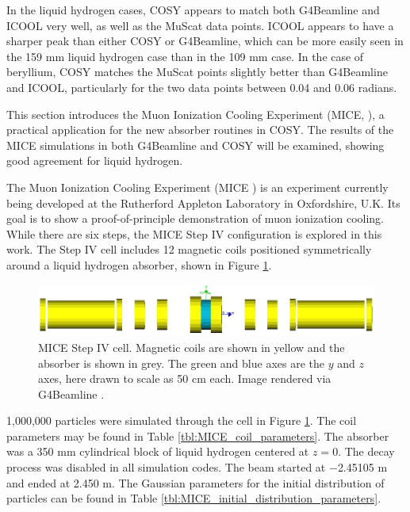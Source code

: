 In the liquid hydrogen cases, COSY appears to match both G4Beamline and ICOOL very well, as well as the MuScat data points. ICOOL appears to have a sharper peak than either COSY or G4Beamline, which can be more easily seen in the 159 mm liquid hydrogen case than in the 109 mm case. In the case of beryllium, COSY matches the MuScat points slightly better than G4Beamline and ICOOL, particularly for the two data points between 0.04 and 0.06 radians.

\label{sec:mice}

This section introduces the Muon Ionization Cooling Experiment (MICE, \cite{mice}), a practical application for the new absorber routines in COSY. The results of the MICE simulations in both G4Beamline and COSY will be examined, showing good agreement for liquid hydrogen.

\label{ssc:miceIntro}
The Muon Ionization Cooling Experiment (MICE \cite{mice}) is an experiment currently being developed at the Rutherford Appleton Laboratory in Oxfordshire, U.K. Its goal is to show a proof-of-principle demonstration of muon ionization cooling. While there are six steps, the MICE Step IV configuration is explored in this work. The Step IV cell includes 12 magnetic coils positioned symmetrically around a liquid hydrogen absorber, shown in Figure \ref{fig:miceStepIV}.
\begin{figure}[h!]
  \centering
    \includegraphics[width=\textwidth]{Figures/miceStepIV} 
  \caption[MICE Step IV cell.]{MICE Step IV cell. Magnetic coils are shown in yellow and the absorber is shown in grey. The green and blue axes are the $y$ and $z$ axes, here drawn to scale as 50 cm each. Image rendered via G4Beamline \cite{g4bl}.}
  \label{fig:miceStepIV}
\end{figure}

\label{ssc:miceResults}
1,000,000 particles were simulated through the cell in Figure \ref{fig:miceStepIV}. The coil parameters may be found in Table \ref{tbl:MICE_coil_parameters}. The absorber was a 350 mm cylindrical block of liquid hydrogen centered at $z=0$. The decay process was disabled in all simulation codes. The beam started at $-$2.45105 m and ended at 2.450 m. The Gaussian parameters for the initial distribution of particles can be found in Table \ref{tbl:MICE_initial_distribution_parameters}.

